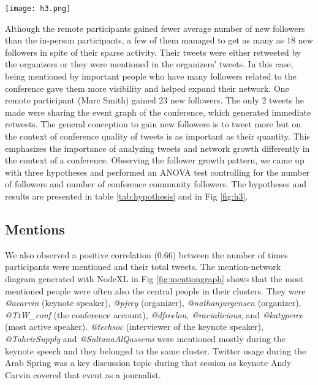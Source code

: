 \documentclass[conference,final]{IEEEtran}
\begin{document}
\begin{figure*}[htbp]
	\centering
		\texttt{[image: h3.png]}
	\caption{ANOVA test results of hypotheses 1, 2 and 3. Covariates appearing in the model: followers count = $2104.88$}
	\label{fig:h3}
\end{figure*}
Although the remote participants gained fewer average number of new followers than the in-person participants, a few of them managed to get as many as $18$ new followers in spite of their sparse activity. Their tweets were either retweeted by the organizers or they were mentioned in the organizers' tweets. In this case, being mentioned by important people who have many followers related to the conference gave them more visibility and helped expand their network. One remote participant (Marc Smith) gained $23$ new followers. The only 2 tweets he made were sharing the event graph of the conference, which generated immediate retweets. The general conception to gain new followers is to tweet more but on the context of conference quality of tweets is as important as their quantity. This emphasizes the importance of analyzing tweets and network growth differently in the context of a conference. Observing the follower growth pattern, we came up with three hypotheses and performed an ANOVA test controlling for the number of followers and number of conference community followers. The hypotheses and results are presented in table \ref{tab:hypothesis} and in Fig \ref{fig:h3}.

\subsection{Mentions}
We also observed a positive correlation ($0.66$) between the number of times participants were mentioned and their total tweets. The mention-network diagram generated with NodeXL \cite{Smith09Analyzingsocialmedia} in Fig \ref{fig:mentiongraph} shows that the most mentioned people were often also the central people in their clusters. They were \textit{@acarvin} (keynote speaker), \textit{@pjrey} (organizer), \textit{@nathanjurgensen} (organizer), \textit{@TtW\_conf} (the conference account), \textit{@dfreelon}, \textit{@racialicious}, and \textit{@katyperce} (most active speaker). \textit{@techsoc} (interviewer of the keynote speaker), \textit{@TahrirSupply} and \textit{@SultanaAlQassemi} were mentioned mostly during the keynote speech and they belonged to the same cluster. Twitter usage during the Arab Spring was a key discussion topic during that session as keynote Andy Carvin covered that event as a journalist.
\end{document}

